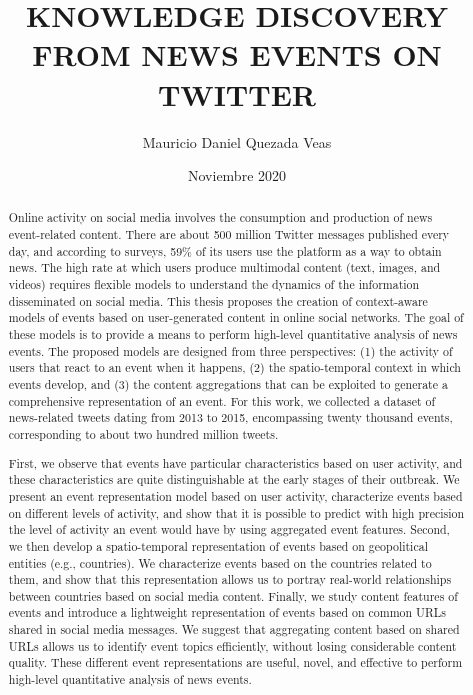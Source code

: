 \documentclass[upright, contnum]{umemoria}
\author{Mauricio Daniel Quezada Veas}
\title{\bf KNOWLEDGE DISCOVERY FROM NEWS EVENTS ON TWITTER}
\date{Noviembre 2020}
\begin{document}
\frontmatter
\maketitle 

\begin{abstract} 

    Online activity on social media involves the consumption and production of
    news event-related content. 
    There are about 500 million Twitter messages published every day, and
    according to surveys, 59\% of its users use the platform as a way to obtain
    news. 
    The high rate at which users produce multimodal content (text, images, and
    videos) requires flexible models to understand the dynamics of the
    information disseminated on social media. 
    This thesis proposes the creation of context-aware models of events based on
    user-generated content in online social networks.
    The goal of these models is to provide a means to perform high-level
    quantitative analysis of news events. 
    The proposed models are designed from three perspectives: 
    (1) the activity of users that react to an event when it happens, 
    (2) the spatio-temporal context in which events develop, and 
    (3) the content aggregations that can be exploited to generate a
    comprehensive representation of an event. 
    For this work, we collected a dataset of news-related tweets dating from
    2013 to 2015, encompassing twenty thousand events, corresponding to about
    two hundred million tweets.

    First, we observe that events have particular characteristics based on user
    activity, and these characteristics are quite distinguishable at the early
    stages of their outbreak.
    We present an event representation model based on user activity,
    characterize events based on different levels of activity, and show that it
    is possible to predict with high precision the level of activity an event
    would have by using aggregated event features.
    Second, we then develop a spatio-temporal representation of events based on
    geopolitical entities (e.g., countries).
    We characterize events based on the countries related to them, and show that
    this representation allows us to portray real-world relationships between
    countries based on social media content.
    Finally, we study content features of events and introduce a lightweight
    representation of events based on common URLs shared in social media
    messages.
    We suggest that aggregating content based on shared URLs allows us to
    identify event topics efficiently, without losing considerable content
    quality.
    These different event representations are useful, novel, and effective to
    perform high-level quantitative analysis of news events.

\end{abstract}
\end{document}
